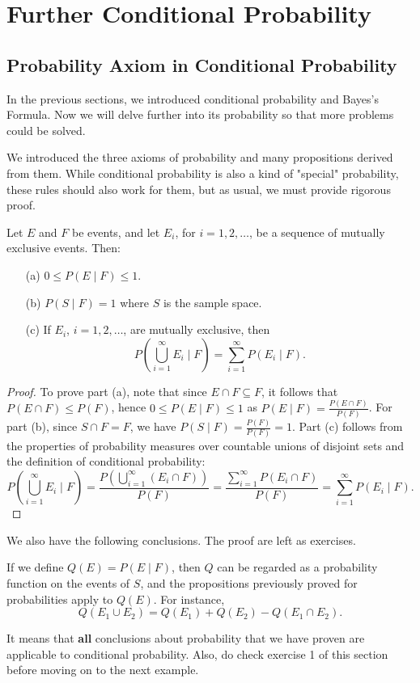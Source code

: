 \section{Further Conditional Probability}
\subsection{Probability Axiom in Conditional Probability}
In the previous sections, we introduced conditional probability and Bayes's Formula. Now we will delve further into its probability so that more problems could be solved. 

We introduced the three axioms of probability and many propositions derived from them. While conditional probability is also a kind of "special" probability, these rules should also work for them, but as usual, we must provide rigorous proof.
\begin{proposition}
	Let $E$ and $F$ be events, and let $E_i$, for $i=1, 2, \ldots$, be a sequence of mutually exclusive events. Then:
	\begin{itemize}
		\item[(a)] \(0 \leq P(E \mid F) \leq 1\).
		\item[(b)] \(P(S \mid F) = 1\) where $S$ is the sample space.
		\item[(c)] If $E_i$, $i = 1, 2, \ldots$, are mutually exclusive, then
		\[
		P\left(\bigcup_{i=1}^\infty E_i \mid F\right) = \sum_{i=1}^\infty P(E_i \mid F).
		\]
	\end{itemize}
\end{proposition}
\begin{proof}
	To prove part (a), note that since $E \cap F \subseteq F$, it follows that $P(E \cap F) \leq P(F)$, hence $0 \leq P(E \mid F) \leq 1$ as $P(E \mid F) = \frac{P(E \cap F)}{P(F)}$. For part (b), since $S \cap F = F$, we have $P(S \mid F) = \frac{P(F)}{P(F)} = 1$. Part (c) follows from the properties of probability measures over countable unions of disjoint sets and the definition of conditional probability:
	\[
	P\left(\bigcup_{i=1}^\infty E_i \mid F\right) = \frac{P\left(\bigcup_{i=1}^\infty (E_i \cap F)\right)}{P(F)} = \frac{\sum_{i=1}^\infty P(E_i \cap F)}{P(F)} = \sum_{i=1}^\infty P(E_i \mid F).
	\]
\end{proof}
We also have the following conclusions. The proof are left as exercises.
\begin{proposition}\label{ex:prob1}
	If we define \(Q(E) = P(E \mid F)\), then \(Q\) can be regarded as a probability function on the events of \(S\), and the propositions previously proved for probabilities apply to \(Q(E)\). For instance,
	\[
	Q(E_1 \cup E_2) = Q(E_1) + Q(E_2) - Q(E_1 \cap E_2).
	\]
\end{proposition}
\begin{remark}
	It means that \textbf{all} conclusions about probability that we have proven are applicable to conditional probability.
    Also, do check exercise 1 of this section before moving on to the next example.
\end{remark}

